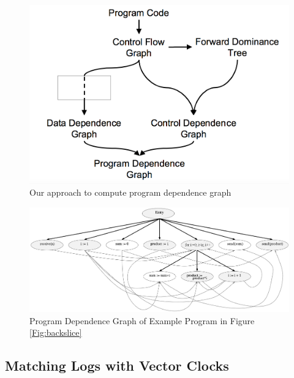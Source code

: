 \begin{figure}
  \includegraphics[width=\columnwidth,scale=0.5]{images/PDG-approach.png}
  \caption{Our approach to compute program dependence graph}
  \label{fig:pdg}
\end{figure}


\begin{figure}
  \includegraphics[width=\columnwidth,scale=0.5]{images/pdg.png}
  \caption{Program Dependence Graph of Example Program in Figure \ref{Fig:backslice} \cite{Tip}}
  \label{fig:expdg}
\end{figure}


\subsection{Matching Logs with Vector Clocks}





